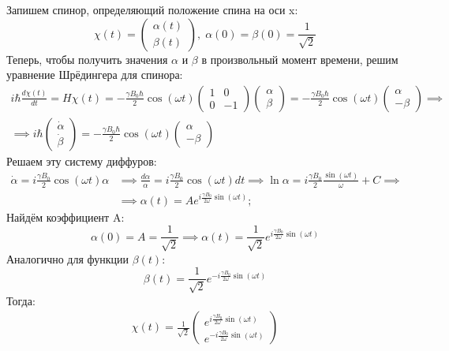 Запишем спинор, определяющий положение спина на оси x:
\[
\chi(t) = \begin{pmatrix}\alpha(t)\\ \beta(t)\end{pmatrix}, \; \alpha(0) = \beta(0) = \frac{1}{\sqrt{2}}
\]
Теперь, чтобы получить значения $\alpha$ и $\beta$ в произвольный момент времени, решим уравнение Шрёдингера для спинора:
\begin{gather*}
i\hbar\frac{d\chi(t)}{dt} = H\chi(t) = -\frac{\gamma B_0\hbar}{2}\cos(\omega t)\begin{pmatrix} 1 & 0 \\ 0 & -1 \end{pmatrix}\begin{pmatrix}\alpha\\ \beta\end{pmatrix} =  -\frac{\gamma B_0\hbar}{2}\cos(\omega t) \begin{pmatrix} \alpha \\ -\beta \end{pmatrix} \implies \\
\implies i\hbar\begin{pmatrix} \dot{\alpha}\\ \dot{\beta} \end{pmatrix} = -\frac{\gamma B_0\hbar}{2}\cos(\omega t) \begin{pmatrix} \alpha \\ -\beta \end{pmatrix}
\end{gather*}
Решаем эту систему диффуров:
\begin{align*}
    \dot{\alpha} = i\frac{\gamma B_0}{2}\cos(\omega t)\alpha &\implies \frac{d\alpha}{\alpha} = i\frac{\gamma B_0}{2}\cos(\omega t)dt \implies \ln\alpha = i\frac{\gamma B_0}{2}\frac{\sin(\omega t)}{\omega} + C \implies \\ 
    & \implies \alpha(t) = Ae^{i\frac{\gamma B_0}{2\omega}\sin(\omega t)};
\end{align*}
Найдём коэффициент A:
\[
\alpha(0) = A = \frac{1}{\sqrt{2}} \implies \alpha(t) = \frac{1}{\sqrt{2}}e^{i\frac{\gamma B_0}{2\omega}\sin(\omega t)}
\]
Аналогично для функции $\beta(t)$:
\[
\beta(t) = \frac{1}{\sqrt{2}}e^{-i\frac{\gamma B_0}{2\omega}\sin(\omega t)}
\]
Тогда:
\begin{align*}
\chi(t) = \frac{1}{\sqrt{2}}\begin{pmatrix} e^{i\frac{\gamma B_0}{2\omega}\sin(\omega t)} \\ e^{-i\frac{\gamma B_0}{2\omega}\sin(\omega t)} \end{pmatrix}
\end{align*}

